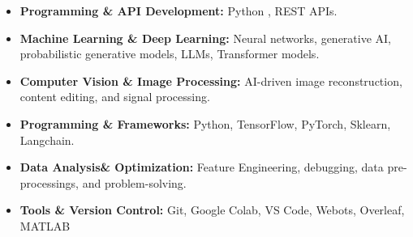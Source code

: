 \documentclass[10 pt, letterpaper]{article}
\begin{document}
\begin{itemize}
    \item \textbf{Programming \& API Development:} Python , REST APIs.
    \vspace{-0.23cm}
    \item \textbf{Machine Learning \& Deep Learning:} Neural networks, generative AI, probabilistic generative models, LLMs, Transformer models.
    \vspace{-0.23cm}
    \item \textbf{Computer Vision \& Image Processing:} AI-driven image reconstruction, content editing, and signal processing.
    \vspace{-0.23cm}
    \item \textbf{Programming \& Frameworks:} Python, TensorFlow, PyTorch, Sklearn, Langchain.
    \vspace{-0.23cm}
    \item \textbf{Data Analysis\& Optimization:} Feature Engineering, debugging, data pre-processings, and problem-solving.
    \item \textbf{Tools \& Version Control:} Git, Google Colab, VS Code, Webots, Overleaf, MATLAB

\end{itemize}
\vspace{-0.1cm}
\end{document}
